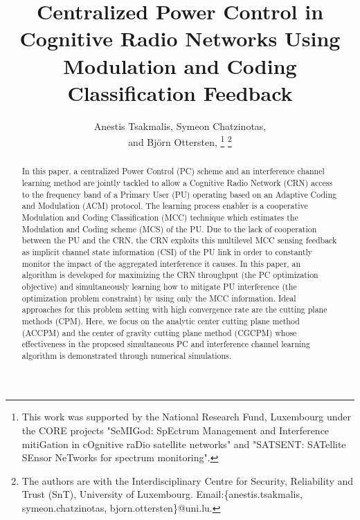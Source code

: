 \documentclass[journal]{IEEEtran}
\begin{document}

\title{Centralized Power Control in Cognitive Radio Networks Using Modulation and Coding Classification Feedback}

\author{Anestis Tsakmalis,  Symeon Chatzinotas, \\and Bj\"{o}rn Ottersten, 
\thanks{This work was supported by the National Research Fund, Luxembourg under the CORE projects "SeMIGod: SpEctrum Management and Interference mitiGation in cOgnitive raDio satellite networks" and "SATSENT: SATellite SEnsor NeTworks for spectrum monitoring".}
\thanks{The authors are with the Interdisciplinary Centre for Security, Reliability
and Trust (SnT), University of Luxembourg. Email:\{anestis.tsakmalis, symeon.chatzinotas, bjorn.ottersten\}@uni.lu.}}


\maketitle


\begin{abstract}

In this paper, a centralized Power Control (PC) scheme and an interference channel learning method are jointly tackled to allow a Cognitive Radio Network (CRN) access to the frequency band of a Primary User (PU) operating based on an Adaptive Coding and Modulation (ACM) protocol. The learning process enabler is a cooperative Modulation and Coding Classification (MCC) technique which estimates the Modulation and Coding scheme (MCS) of the PU. Due to the lack of cooperation between the PU and the CRN, the CRN exploits this multilevel MCC sensing feedback as implicit channel state information (CSI) of the PU link in order to constantly monitor the impact of the aggregated interference it causes. In this paper, an algorithm is developed for maximizing the CRN throughput (the PC optimization objective) and simultaneously learning how to mitigate PU interference (the optimization problem constraint) by using only the MCC information. Ideal approaches for this problem setting with high convergence rate are the cutting plane methods (CPM). Here, we focus on the analytic center cutting plane method (ACCPM) and the center of gravity cutting plane method (CGCPM) whose effectiveness in the proposed simultaneous PC and interference channel learning algorithm is demonstrated through numerical simulations.

\end{abstract}
\end{document}
